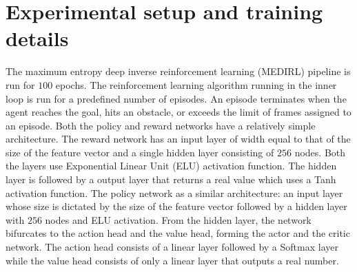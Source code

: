 \section{Experimental setup and training details}
\label{sec:exp-setup}
 The maximum entropy deep inverse reinforcement learning (MEDIRL) pipeline is run for $100$ epochs. The reinforcement learning algorithm \cite{mnih_actor_critic_2016} running in the inner loop is run for a predefined number of episodes. An episode terminates when the agent reaches the goal, hits an obstacle, or exceeds the limit of frames assigned to an episode. Both the policy and reward networks have a relatively simple architecture. The reward network has an input layer of width equal to that of the size of the feature vector and a single hidden layer consisting of $256$ nodes. Both the layers use Exponential Linear Unit (ELU) \cite{elu} activation function. The hidden layer is followed by a output layer that returns a real value which uses a Tanh activation function. The policy network as a similar architecture: an input layer whose size is dictated by the size of the feature vector followed by a hidden layer with $256$ nodes and ELU activation. From the hidden layer, the network bifurcates to the action head and the value head, forming the actor and the critic network. The action head consists of a linear layer followed by a Softmax layer while the value head consists of only a linear layer that outputs a real number.


